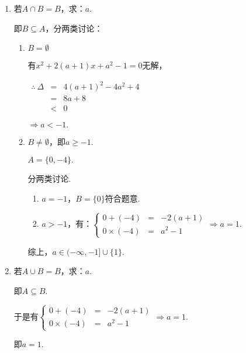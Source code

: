\documentclass[8pt]{article}
\begin{document}
				\begin{enumerate}[label=(\arabic*)]
					\item 若$A\cap B=B$，求：$a$.

						即$B\subseteq A$，分两类讨论：

						\begin{enumerate}[label=$\arabic*^{\circ}$]

							\item $B=\emptyset$

								有$x^2+2(a+1)x+a^2-1=0$无解，

								$\displaystyle\begin{array}{rcl}\therefore\ \Delta&=&4(a+1)^2-4a^2+4\\&=&8a+8\\&<&0\end{array}$

								$\Rightarrow a<-1.$

							\item $B\neq\emptyset$，即$a\geq -1$.

								$A=\{0, -4\}.$

								分两类讨论.

								\begin{enumerate}[label=$2.\arabic*^{\circ}$]

									\item $a=-1$，$B=\{0\}$符合题意.

									\item $a>-1$，有：$\displaystyle\left\{\begin{array}{rcl}0+(-4)&=&-2(a+1)\\0\times(-4)&=&a^2-1\end{array}\right. \Rightarrow a=1.$

								\end{enumerate}

								综上，$a\in(-\infty, -1]\cup\{1\}.$

						\end{enumerate}

					\item 若$A\cup B=B$，求：$a$.

						即$A\subseteq B$.

						于是有$\displaystyle\left\{\begin{array}{rcl}0+(-4)&=&-2(a+1)\\0\times(-4)&=&a^2-1\end{array}\right. \Rightarrow a=1.$

						即$a=1$.

				\end{enumerate}
\end{document}
